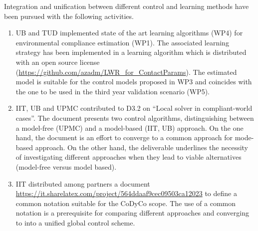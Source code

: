 \documentclass[12pt,a4paper,twoside]{article}
\begin{document}
\medskip
\noindent 
Integration and unification between different control and learning methods have been pursued with the following activities. 

\begin{enumerate}
\item UB and TUD implemented state of the art learning algorithms (WP4) for environmental compliance estimation (WP1). The associated learning strategy has been implemented in a learning algorithm which is distributed with an open source license (\url{https://github.com/azadm/LWR_for_ContactParams}). The estimated model is suitable for the control models proposed in WP3 and coincides with the one to be used in the third year validation scenario (WP5). 

\item IIT, UB and UPMC contributed to D3.2 on ``Local solver in compliant-world cases''. The document presents two control algorithms, distinguishing between a model-free (UPMC) and a model-based (IIT, UB) approach. On the one hand, the document is an effort to converge to a common approach for mode-based approach. On the other hand, the deliverable underlines the necessity of investigating different approaches when they lead to viable alternatives (model-free versus model based). 

\item IIT distributed among partners a document \url{https://it.sharelatex.com/project/564ddaaf9cec09503ca12023} to define a common notation suitable for the CoDyCo scope. The use of a common notation is a prerequisite for comparing different approaches and converging to into a unified global control scheme. 
\end{enumerate}
\end{document}
